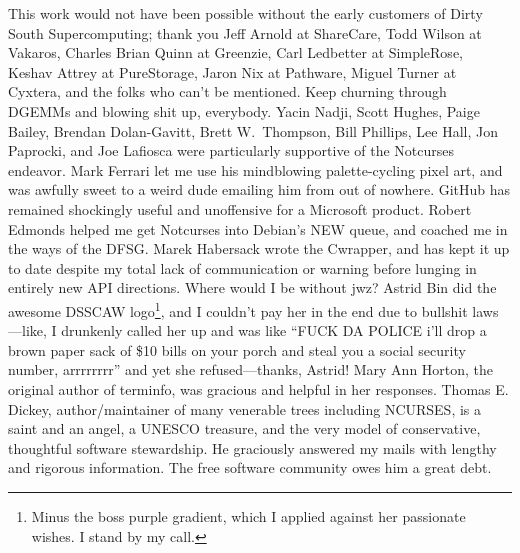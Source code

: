 \documentclass[letterpaper,10pt]{article}
\newcommand\CC{C\nolinebreak\hspace{-.05em}\raisebox{.4ex}{\relsize{-3}{\textbf{+}}}\nolinebreak\hspace{-.10em}\raisebox{.4ex}{\relsize{-3}{\textbf{+}}}\hspace{.2em}}
\begin{document}
This work would not have been possible without the early customers of
Dirty South Supercomputing; thank you Jeff Arnold at ShareCare,
Todd Wilson at Vakaros, Charles Brian Quinn at Greenzie, Carl Ledbetter
at SimpleRose, Keshav Attrey at PureStorage, Jaron Nix at Pathware,
Miguel Turner at Cyxtera, and the folks who can't be mentioned. Keep
churning through DGEMMs and blowing shit up, everybody. Yacin Nadji,
Scott Hughes, Paige Bailey, Brendan Dolan-Gavitt, Brett W.\ Thompson, Bill
Phillips, Lee Hall, Jon Paprocki, and Joe Lafiosca were particularly supportive of the Notcurses
endeavor. Mark Ferrari let me use his mindblowing palette-cycling pixel art,
and was awfully sweet to a weird dude emailing him from out of nowhere. GitHub
has remained shockingly useful and unoffensive for a Microsoft product. Robert
Edmonds helped me get Notcurses into Debian's NEW queue, and coached me in the
ways of the DFSG. Marek Habersack wrote the \CC wrapper, and has kept it up to
date despite my total lack of communication or warning before lunging in
entirely new API directions. Where would I be without jwz? Astrid Bin did the
awesome DSSCAW logo\footnote{Minus the boss purple gradient, which I applied
  against her passionate wishes. I stand by my call.}, and I couldn't pay her
in the end due to bullshit laws---like, I drunkenly called her up and was like
``FUCK DA POLICE i'll drop a brown paper sack of \$10 bills on your porch and
steal you a social security number, arrrrrrrr'' and yet she refused---thanks,
Astrid! Mary Ann Horton, the original author of terminfo, was gracious and
helpful in her responses. Thomas E. Dickey, author/maintainer of many venerable
trees including NCURSES, is a saint and an angel, a UNESCO treasure, and the
very model of conservative, thoughtful software stewardship. He graciously
answered my mails with lengthy and rigorous information. The free software
community owes him a great debt.
\end{document}
